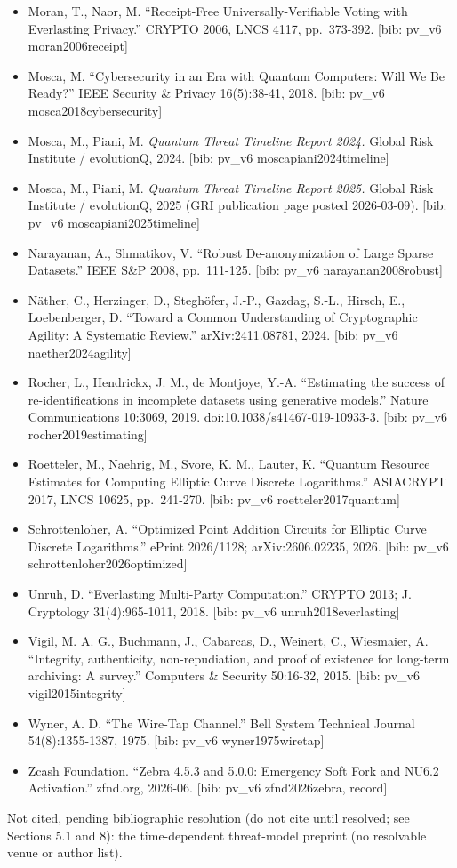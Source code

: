 \documentclass[
  11pt,
]{article}
\begin{document}
\begin{itemize}
  pv\_v6 litinski2023compute{]}
\item
  Moran, T., Naor, M. ``Receipt-Free Universally-Verifiable Voting with
  Everlasting Privacy.'' CRYPTO 2006, LNCS 4117, pp.~373-392. {[}bib:
  pv\_v6 moran2006receipt{]}
\item
  Mosca, M. ``Cybersecurity in an Era with Quantum Computers: Will We Be
  Ready?'' IEEE Security \& Privacy 16(5):38-41, 2018. {[}bib: pv\_v6
  mosca2018cybersecurity{]}
\item
  Mosca, M., Piani, M. \emph{Quantum Threat Timeline Report 2024.}
  Global Risk Institute / evolutionQ, 2024. {[}bib: pv\_v6
  moscapiani2024timeline{]}
\item
  Mosca, M., Piani, M. \emph{Quantum Threat Timeline Report 2025.}
  Global Risk Institute / evolutionQ, 2025 (GRI publication page posted
  2026-03-09). {[}bib: pv\_v6 moscapiani2025timeline{]}
\item
  Narayanan, A., Shmatikov, V. ``Robust De-anonymization of Large Sparse
  Datasets.'' IEEE S\&P 2008, pp.~111-125. {[}bib: pv\_v6
  narayanan2008robust{]}
\item
  Näther, C., Herzinger, D., Steghöfer, J.-P., Gazdag, S.-L., Hirsch,
  E., Loebenberger, D. ``Toward a Common Understanding of Cryptographic
  Agility: A Systematic Review.'' arXiv:2411.08781, 2024. {[}bib: pv\_v6
  naether2024agility{]}
\item
  Rocher, L., Hendrickx, J. M., de Montjoye, Y.-A. ``Estimating the
  success of re-identifications in incomplete datasets using generative
  models.'' Nature Communications 10:3069, 2019.
  doi:10.1038/s41467-019-10933-3. {[}bib: pv\_v6 rocher2019estimating{]}
\item
  Roetteler, M., Naehrig, M., Svore, K. M., Lauter, K. ``Quantum
  Resource Estimates for Computing Elliptic Curve Discrete Logarithms.''
  ASIACRYPT 2017, LNCS 10625, pp.~241-270. {[}bib: pv\_v6
  roetteler2017quantum{]}
\item
  Schrottenloher, A. ``Optimized Point Addition Circuits for Elliptic
  Curve Discrete Logarithms.'' ePrint 2026/1128; arXiv:2606.02235, 2026.
  {[}bib: pv\_v6 schrottenloher2026optimized{]}
\item
  Unruh, D. ``Everlasting Multi-Party Computation.'' CRYPTO 2013; J.
  Cryptology 31(4):965-1011, 2018. {[}bib: pv\_v6
  unruh2018everlasting{]}
\item
  Vigil, M. A. G., Buchmann, J., Cabarcas, D., Weinert, C., Wiesmaier,
  A. ``Integrity, authenticity, non-repudiation, and proof of existence
  for long-term archiving: A survey.'' Computers \& Security 50:16-32,
  2015. {[}bib: pv\_v6 vigil2015integrity{]}
\item
  Wyner, A. D. ``The Wire-Tap Channel.'' Bell System Technical Journal
  54(8):1355-1387, 1975. {[}bib: pv\_v6 wyner1975wiretap{]}
\item
  Zcash Foundation. ``Zebra 4.5.3 and 5.0.0: Emergency Soft Fork and
  NU6.2 Activation.'' zfnd.org, 2026-06. {[}bib: pv\_v6 zfnd2026zebra,
  record{]}
\end{itemize}

Not cited, pending bibliographic resolution (do not cite until resolved;
see Sections 5.1 and 8): the time-dependent threat-model preprint (no
resolvable venue or author list).
\end{document}
